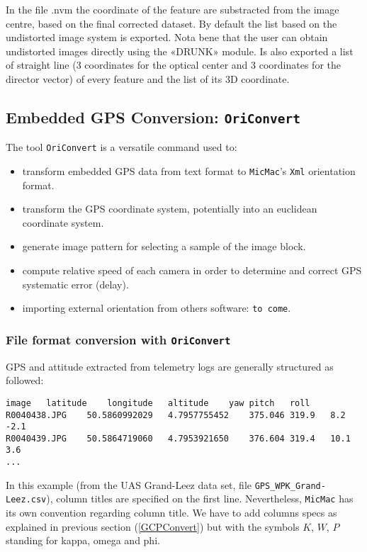 	In the file .nvm the coordinate of the feature are substracted from the image centre, based on the final corrected dataset. By default the list based on the undistorted image system is exported. Nota bene that the user can obtain undistorted images directly using the «DRUNK» module. Is also exported a list of straight line (3 coordinates for the optical center and 3 coordinates for the director vector) of every feature and the list of its 3D coordinate.



\subsection{Embedded GPS Conversion: {\tt OriConvert}}\label{OriConvert}

The tool {\tt OriConvert} is a versatile command used to:
\begin{itemize}
\item transform embedded GPS data from text format to {\tt MicMac}'s {\tt Xml} orientation format.
\item transform the GPS coordinate system, potentially into an euclidean coordinate system.
\item generate image pattern for selecting a sample of the image block.
\item compute relative speed of each camera in order to determine and correct GPS systematic error (delay).
\item importing external orientation from others software: {\tt to come}.
\end{itemize}

\subsubsection{File format conversion with {\tt OriConvert}}

GPS and attitude extracted from telemetry logs are generally structured as followed:

\begin{verbatim}
image	latitude	longitude	altitude	yaw	pitch	roll
R0040438.JPG	50.5860992029	4.7957755452	375.046	319.9	8.2	-2.1
R0040439.JPG	50.5864719060	4.7953921650	376.604	319.4	10.1	3.6
...
\end{verbatim}


In this example (from the UAS Grand-Leez data set, file {\tt GPS\_WPK\_Grand-Leez.csv}), column titles are specified on the first line. Nevertheless, {\tt MicMac} has its own convention regarding column title. We have to add columns specs as explained in previous section (\ref{GCPConvert}) but with the symbols $K$, $W$, $P$ standing for kappa, omega and phi.

